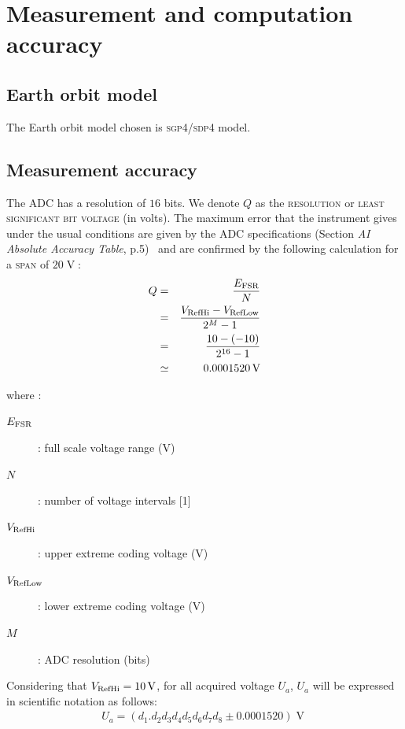 \documentclass[a4paper]{report}
\begin{document}
\chapter{Measurement and computation accuracy}
\label{sec:results}

\section {Earth orbit model}

The Earth orbit model chosen is \textsc{sgp4/sdp4} model.

\section{Measurement accuracy}

The ADC has a resolution of $16$ bits. We denote $Q$ as the \textsc{resolution} or \textsc{least significant bit voltage} (in volts). The maximum error that the instrument gives under the usual conditions are given by the ADC specifications (Section \textit{AI Absolute Accuracy Table}, p.5)~\cite{NI_6353_datasheet} and are confirmed by the following calculation for a \textsc{span} of $20 \operatorname{V}$:
\begin{eqnarray*}
  Q &=& \frac{E_{\textup{FSR}}}{N}\\
    &=& \frac{V_{\textup{RefHi}} - V_{\textup{RefLow}}}{2^M - 1}\\
    &=& \frac{10 - (-10)}{2^{16} - 1}\\
    &\simeq& 0.0001520 \operatorname{V}
\end{eqnarray*}

where :

\begin{description}
  \item[$E_{\textup{FSR}}$]{ : full scale voltage range (V)}
  \item[$N$]{ : number of voltage intervals [1]}
  \item[$V_{\textup{RefHi}}$]{ : upper extreme coding voltage (V)}
  \item[$V_{\textup{RefLow}}$]{ : lower extreme coding voltage (V)}
  \item[$M$]{ : ADC resolution (bits)}
\end{description}

Considering that $V_{\textup{RefHi}} = 10 \operatorname{V}$, for all acquired voltage $U_a$, $U_a$ will be expressed in scientific notation as follows:
\begin{eqnarray*}
  U_a = \left ( d_1.d_2d_3d_4d_5d_6d_7d_8 \pm 0.0001520 \right ) \operatorname{V}
\end{eqnarray*}
\end{document}
